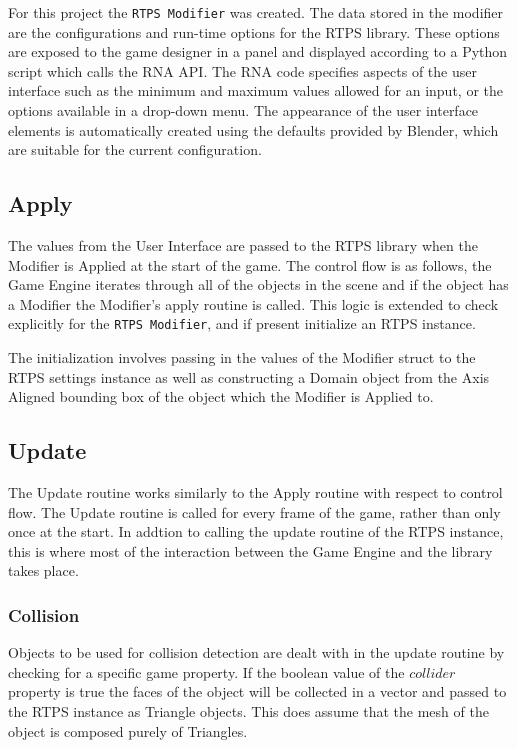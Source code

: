 For this project the \verb|RTPS Modifier| was created.\cite{enjaCustomModifier} The
data stored in the modifier are the configurations and run-time options for the
RTPS library.  These options are exposed to the game designer in a panel and
displayed according to a Python script which calls the RNA API. The RNA code
specifies aspects of the user interface such as the minimum and maximum values
allowed for an input, or the options available in a drop-down menu. The
appearance of the user interface elements is automatically created using the
defaults provided by Blender, which are suitable for the current configuration.


\subsection{Apply}
The values from the User Interface are passed to the RTPS library when the
Modifier is Applied at the start of the game. The control flow is as follows,
the Game Engine iterates through all of the objects in the scene and if the
object has a Modifier the Modifier's apply routine is called. This logic is
extended to check explicitly for the \verb|RTPS Modifier|, and if present initialize
an RTPS instance.


The initialization involves passing in the values of the Modifier struct to the
RTPS settings instance as well as constructing a Domain object from the Axis
Aligned bounding box of the object which the Modifier is Applied to.

\subsection{Update}

The Update routine works similarly to the Apply routine with respect to control
flow. The Update routine is called for every frame of the game, rather than
only once at the start. In addtion to calling the update routine of the RTPS
instance, this is where most of the interaction between the Game Engine and the
library takes place.

\subsubsection{Collision}
Objects to be used for collision detection are dealt with in the update routine
by checking for a specific game property. If the boolean value of the
$collider$ property is true the faces of the object will be collected in a
vector and passed to the RTPS instance as Triangle objects. This does assume
that the mesh of the object is composed purely of Triangles. 

